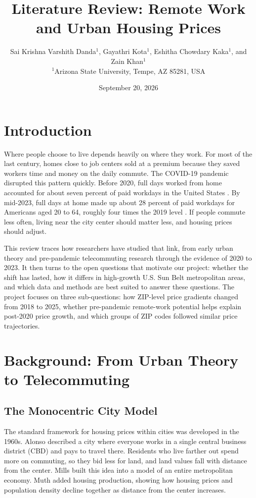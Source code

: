 \documentclass[11pt]{article}
\title{Literature Review: Remote Work and Urban Housing Prices}
\author{Sai Krishna Varshith Danda$^{1}$, Gayathri Kota$^{1}$,
Eshitha Chowdary Kaka$^{1}$, and Zain Khan$^{1}$\\
$^{1}$Arizona State University, Tempe, AZ 85281, USA}
\date{September 20, 2026}
\begin{document}
\maketitle

\section{Introduction}

Where people choose to live depends heavily on where they work. For most of the last century, homes close to job centers sold at a premium because they saved workers time and money on the daily commute. The COVID-19 pandemic disrupted this pattern quickly. Before 2020, full days worked from home accounted for about seven percent of paid workdays in the United States \cite{barrero2023evolution}. By mid-2023, full days at home made up about 28 percent of paid workdays for Americans aged 20 to 64, roughly four times the 2019 level \cite{barrero2023evolution}. If people commute less often, living near the city center should matter less, and housing prices should adjust.

This review traces how researchers have studied that link, from early urban theory and pre-pandemic telecommuting research through the evidence of 2020 to 2023. It then turns to the open questions that motivate our project: whether the shift has lasted, how it differs in high-growth U.S. Sun Belt metropolitan areas, and which data and methods are best suited to answer these questions. The project focuses on three sub-questions: how ZIP-level price gradients changed from 2018 to 2025, whether pre-pandemic remote-work potential helps explain post-2020 price growth, and which groups of ZIP codes followed similar price trajectories.

\section{Background: From Urban Theory to Telecommuting}

\subsection{The Monocentric City Model}

The standard framework for housing prices within cities was developed in the 1960s. Alonso \cite{alonso1964location} described a city where everyone works in a single central business district (CBD) and pays to travel there. Residents who live farther out spend more on commuting, so they bid less for land, and land values fall with distance from the center. Mills \cite{mills1967aggregative} built this idea into a model of an entire metropolitan economy. Muth \cite{muth1969cities} added housing production, showing how housing prices and population density decline together as distance from the center increases.
\end{document}
